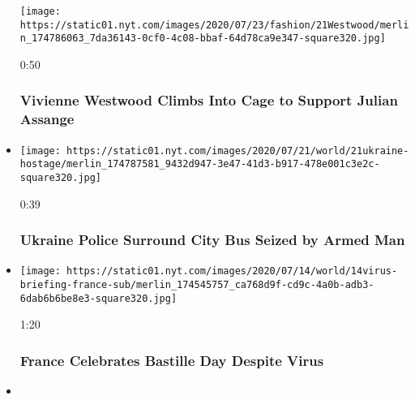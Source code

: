 \begin{itemize}
  \texttt{[image: https://static01.nyt.com/images/2020/07/23/fashion/21Westwood/merlin\_174786063\_7da36143-0cf0-4c08-bbaf-64d78ca9e347-square320.jpg]}

  0:50

  \hypertarget{vivienne-westwood-climbs-into-cage-to-support-julian-assange}{%
  \subsubsection{Vivienne Westwood Climbs Into Cage to Support Julian
  Assange}\label{vivienne-westwood-climbs-into-cage-to-support-julian-assange}}
\item
  \href{https://www.nytimes.com/video/us/100000007249315/hostages-on-ukraine-city-bus.html?action=click\&module=video-series-bar\&region=header\&pgtype=Article\&playlistId=video/world}{}

  \texttt{[image: https://static01.nyt.com/images/2020/07/21/world/21ukraine-hostage/merlin\_174787581\_9432d947-3e47-41d3-b917-478e001c3e2c-square320.jpg]}

  0:39

  \hypertarget{ukraine-police-surround-city-bus-seized-by-armed-man}{%
  \subsubsection{Ukraine Police Surround City Bus Seized by Armed
  Man}\label{ukraine-police-surround-city-bus-seized-by-armed-man}}
\item
  \href{https://www.nytimes.com/video/world/europe/100000007237802/france-bastille-day-virus.html?action=click\&module=video-series-bar\&region=header\&pgtype=Article\&playlistId=video/world}{}

  \texttt{[image: https://static01.nyt.com/images/2020/07/14/world/14virus-briefing-france-sub/merlin\_174545757\_ca768d9f-cd9c-4a0b-adb3-6dab6b6be8e3-square320.jpg]}

  1:20

  \hypertarget{france-celebrates-bastille-day-despite-virus}{%
  \subsubsection{France Celebrates Bastille Day Despite
  Virus}\label{france-celebrates-bastille-day-despite-virus}}
\item
  \href{https://www.nytimes.com/video/us/100000007236404/seoul-mayor-abuse-sexual-harassment.html?action=click\&module=video-series-bar\&region=header\&pgtype=Article\&playlistId=video/world}{}


\end{itemize}
